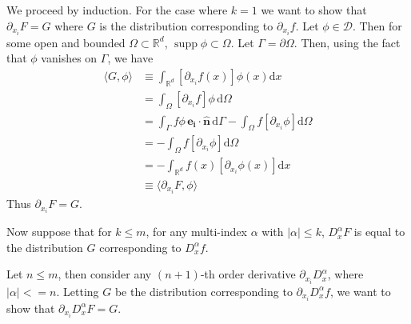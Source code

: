 \documentclass{article}
\DeclareMathOperator\supp{supp}
\begin{document}
We proceed by induction. For the case where $k = 1$ we want to show that
$\partial_{x_i}F = G$ where $G$ is the distribution corresponding to
$\partial_{x_i} f$. Let $\phi \in \mathcal{D}$. Then for some open and
bounded $\Omega \subset \mathbb{R}^d$, $\supp \phi \subset \Omega$. Let
$\Gamma = \partial \Omega$. Then, using the fact that $\phi$ vanishes on
$\Gamma$, we have
%
\begin{align*}
    \langle G, \phi \rangle
        &\equiv \int_{\mathbb{R}^d} \left[\partial_{x_i} f(x)\right] \phi(x) \mathrm{d} x \\
        &= \int_{\Omega} \left[\partial_{x_i} f\right] \phi \,\mathrm{d} \Omega \\
        &= \int_{\Gamma} f \phi \,\mathbf{e_i} \cdot \mathbf{\hat{n}} \,\mathrm{d} \Gamma
            - \int_{\Omega} f \left[ \partial_{x_i} \phi \right] \mathrm{d} \Omega \\
        &= - \int_{\Omega} f \left[ \partial_{x_i} \phi \right] \mathrm{d} \Omega \\
        &= - \int_{\mathbb{R}^d} f(x) \left[ \partial_{x_i} \phi(x) \right] \mathrm{d} x \\
        &\equiv \langle \partial_{x_i} F, \phi \rangle
\end{align*}
%
Thus $\partial_{x_i} F = G$.

Now suppose that for $k \leq m$, for any multi-index $\alpha$ with
$|\alpha| \leq k$, $D_x^\alpha F$ is equal to the distribution $G$
corresponding to $D_x^\alpha f$.

Let $n \leq m$, then consider any $(n + 1)$-th order derivative
$\partial_{x_i} D_x^\alpha$, where $|\alpha| <= n$. Letting $G$ be the
distribution corresponding to $\partial_{x_i} D_x^\alpha f$, we want to
show that $\partial_{x_i} D_x^\alpha F = G$.
\end{document}
